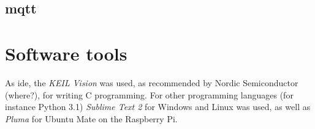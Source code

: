 \subsection{\gls{mqtt}}

\section{Software tools}

As \gls{ide}, the \textit{KEIL Vision} was used, as recommended by Nordic Semiconductor (where?), for writing C programming. For other programming languages (for instance Python 3.1) \textit{Sublime Text 2} for Windows and Linux was used, as well as \textit{Pluma} for Ubuntu Mate on the Raspberry Pi. 






